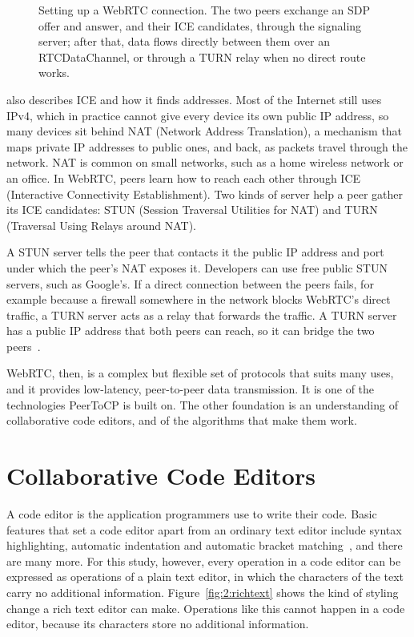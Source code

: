 \begin{figure}[htbp]
    \centering
    
    \caption[Setting up a WebRTC connection]{Setting up a WebRTC connection. The two peers exchange an SDP offer and answer, and their ICE candidates, through the signaling server; after that, data flows directly between them over an RTCDataChannel, or through a TURN relay when no direct route works.}
    \label{fig:2:signaling}
\end{figure}

\citet{rfc8839} also describes ICE and how it finds addresses. Most of the Internet still uses IPv4, which in practice cannot give every device its own public IP address, so many devices sit behind NAT (Network Address Translation), a mechanism that maps private IP addresses to public ones, and back, as packets travel through the network. NAT is common on small networks, such as a home wireless network or an office. In WebRTC, peers learn how to reach each other through ICE (Interactive Connectivity Establishment). Two kinds of server help a peer gather its ICE candidates: STUN (Session Traversal Utilities for NAT) and TURN (Traversal Using Relays around NAT).

A STUN server tells the peer that contacts it the public IP address and port under which the peer's NAT exposes it. Developers can use free public STUN servers, such as Google's. If a direct connection between the peers fails, for example because a firewall somewhere in the network blocks WebRTC's direct traffic, a TURN server acts as a relay that forwards the traffic. A TURN server has a public IP address that both peers can reach, so it can bridge the two peers~\citep{rfc5766}.

WebRTC, then, is a complex but flexible set of protocols that suits many uses, and it provides low-latency, peer-to-peer data transmission. It is one of the technologies PeerToCP is built on. The other foundation is an understanding of collaborative code editors, and of the algorithms that make them work.

\section{Collaborative Code Editors}

A code editor is the application programmers use to write their code. Basic features that set a code editor apart from an ordinary text editor include syntax highlighting, automatic indentation and automatic bracket matching~\citep{kinder2013sublime, intellij2011most}, and there are many more. For this study, however, every operation in a code editor can be expressed as operations of a plain text editor, in which the characters of the text carry no additional information. Figure~\ref{fig:2:richtext} shows the kind of styling change a rich text editor can make. Operations like this cannot happen in a code editor, because its characters store no additional information.

